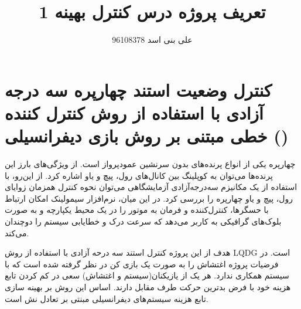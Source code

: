 \documentclass[12 pt]{article}
\title{تعریف پروژه درس کنترل بهینه 1}
\author{علی بنی اسد 96108378}
\begin{document}
	\maketitle
	\section*{کنترل وضعیت استند چهارپره
		 سه درجه آزادی 
		با استفاده از روش کنترل کننده خطی مبتنی بر روش بازی دیفرانسیلی
()	
}





چهارپره یکی از انواع پرنده‌های بدون سرنشین عمودپرواز است. از ویژگی‌های بارز این پرنده‌ها می‌توان به کوپلینگ بین کانال‌های رول، پیچ و یاو اشاره کرد. از این‌رو، با استفاده از یک مکانیزم ‌سه‌درجه‌آزادی آزمایشگاهی می‌توان نحوه کنترل همزمان زوایای رول، پیچ و یاو چهارپره را بررسی کرد. در این میان، نرم‌افزار‌ سیمولینک امکان ارتباط با حسگرها، کنترل‌کننده و فرمان به موتور را در یک محیط یکپارچه و به ‌صورت بلوک‌های گرافیکی به کاربر می‌دهد که سرعت درک و خطا‌یابی سیستم را دوچندان می‌کند.



هدف از این پروژه کنترل استند سه درحه آزادی با استفاده از روش LQDG است. در فرضیات پروژه اغتشاش را به صورت یک بازی کن در نظر گرفته شده است که با سیستم همکاری ندارد. هر یک از یازیکنان(سیستم و اغتشاش) سعی در کم کردن تابع هزینه خود با فرض بدترین حرکت طرف مقابل دارند. اساس این روش بر بهینه سازی تابع هزینه سیستم‌های دیفرانسیلی مبنتی بر تعادل نش 
است.
\end{document}
